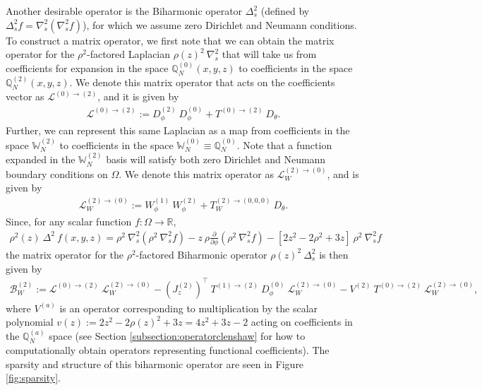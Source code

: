 \documentclass[11pt, oneside]{article}   	%
\newcommand{\R}{\mathbb{R}}
\newcommand{\bigW}{\mathbb{W}}
\newcommand{\bigscop}{{\mathbb{Q}}}
\newcommand{\bigscopN}{\bigscop_{N}}
\newcommand{\ppphi}{\frac{\partial}{\partial \phi}}
\newcommand{\rhoppphi}{\rho \ppphi}
\begin{document}
Another desirable operator is the Biharmonic operator $\Delta^2_s$ (defined by $\Delta^2_s f = \nabla^2_s (\nabla^2_s f)$), for which we assume zero Dirichlet and Neumann conditions. To construct a matrix operator, we first note that we can obtain the matrix operator for the $\rho^2$-factored Laplacian $\rho(z)^2 \: \nabla^2_s$ that will take us from coefficients for expansion in the space $\bigscopN^{(0)}(x,y,z)$ to coefficients in the space $\bigscopN^{(2)}(x,y,z)$. We denote this matrix operator that acts on the coefficients vector as $\mathcal{L}^{(0) \to (2)}$, and it is given by
\begin{align*}
    \mathcal{L}^{(0) \to (2)} := D_\phi^{(2)} \: D_\phi^{(0)} + T^{(0)\to(2)} \: D_\theta.
\end{align*}
Further, we can represent this same Laplacian as a map from coefficients in the space $\bigW_N^{(2)}$ to coefficients in the space $\bigW_N^{(0)} \equiv \bigscopN^{(0)}$. Note that a function expanded in the $\bigW_N^{(2)}$ basis will satisfy both zero Dirichlet and Neumann boundary conditions on $\Omega$. We denote this matrix operator as $\mathcal{L}_W^{(2) \to (0)}$, and is given by
\begin{align*}
	\mathcal{L}_W^{(2) \to (0)} := W_\phi^{(1)} \: W_\phi^{(2)} + T_W^{(2)\to(0,0,0)} \: D_\theta.
\end{align*}
Since, for any scalar function $f:\Omega \to \R$,
\begin{align*}
	\rho^2(z) \: \Delta^2 \: f(x,y,z) = \rho^2 \: \nabla^2_s (\rho^2 \: \nabla^2_s f) - z \: \rhoppphi (\rho^2 \: \nabla^2_s f) - [2z^2 - 2\rho^2 + 3z] \:\rho^2 \: \nabla^2_s f
\end{align*}
the matrix operator for the $\rho^2$-factored Biharmonic operator $\rho(z)^2 \: \Delta_s^2$ is then given by
\begin{align*}
	\mathcal{B}_W^{(2)} := \mathcal{L}^{(0) \to (2)} \: \mathcal{L}_W^{(2) \to (0)} - (J_z^{(2)})^\top \: T^{(1)\to(2)} \: D_\phi^{(0)} \: \mathcal{L}_W^{(2) \to (0)} - V^{(2)} \:  T^{(0)\to(2)} \: \mathcal{L}_W^{(2) \to (0)},
\end{align*}
where $V^{(a)}$ is an operator corresponding to multiplication by the scalar polynomial $v(z) := 2z^2 - 2\rho(z)^2 + 3z = 4z^2 + 3z - 2$ acting on coefficients in the $\bigscopN^{(a)}$ space (see Section \ref{subsection:operatorclenshaw} for how to computationally obtain operators representing functional coefficients). The sparsity and structure of this biharmonic operator are seen in Figure \ref{fig:sparsity}.
\end{document}
